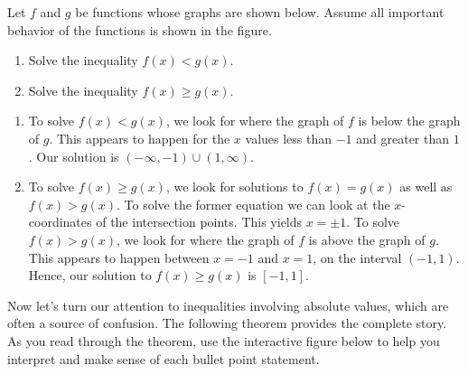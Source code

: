 \documentclass[noauthor, nooutcomes]{ximera}
\begin{document}
\begin{example}
Let $f$ and $g$ be functions whose graphs are shown below. Assume all important behavior of the functions is shown in the figure.

\begin{image}
\end{image}
 
\begin{enumerate}
	\item Solve the inequality $f(x) < g(x)$.
	\item Solve the inequality $f(x) \ge g(x)$.
\end{enumerate}
\end{example}


\begin{explanation}
\begin{enumerate}
	\item  To solve $f(x) < g(x)$, we look for where the graph of $f$ is below the graph of $g$. This appears to happen for the $x$ values less than $-1$ and greater than $1$. Our solution is $(-\infty, -1) \cup (1,\infty)$.

	\item To solve $f(x) \geq g(x)$, we look for solutions to $f(x)=g(x)$ as well as $f(x) > g(x)$. To solve the former equation we can look at the $x$-coordinates of the intersection points. This yields $x = \pm 1$. To solve $f(x) > g(x)$, we look for where the graph of $f$ is above the graph of $g$.  This appears to happen between $x=-1$ and $x=1$, on the interval $(-1,1)$. Hence, our solution to $f(x) \geq g(x)$ is $[-1,1]$. 
\end{enumerate}
\end{explanation}

Now let's turn our attention to inequalities involving absolute values, which are often a source of confusion. The following theorem provides the complete story. As you read through the theorem, use the interactive figure below to help you interpret and make sense of each bullet point statement.
\end{document}
